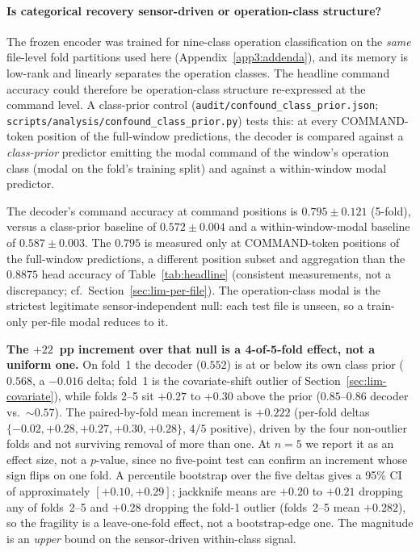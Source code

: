 \documentclass[sensors,article,submit,moreauthors,pdftex]{Definitions/mdpi}
\begin{document}
\paragraph{Is categorical recovery sensor-driven or operation-class structure?}\label{sec:disc-confound}\hspace*{0pt plus 1fill}

The frozen encoder was trained for nine-class operation classification on the \emph{same} file-level fold partitions used here (Appendix~\ref{app3:addenda}), and its memory is low-rank and linearly separates the operation classes. The headline command accuracy could therefore be operation-class structure re-expressed at the command level. A class-prior control (\texttt{audit/confound\_class\_prior.json}; \texttt{scripts/analysis/confound\_class\_prior.py}) tests this: at every COMMAND-token position of the full-window predictions, the decoder is compared against a \emph{class-prior} predictor emitting the modal command of the window's operation class (modal on the fold's training split) and against a within-window modal predictor.

The decoder's command accuracy at command positions is $0.795 \pm 0.121$ (5-fold), versus a class-prior baseline of $0.572 \pm 0.004$ and a within-window-modal baseline of $0.587 \pm 0.003$. The $0.795$ is measured only at COMMAND-token positions of the full-window predictions, a different position subset and aggregation than the $0.8875$ head accuracy of Table~\ref{tab:headline} (consistent measurements, not a discrepancy; cf.\ Section~\ref{sec:lim-per-file}). The operation-class modal is the strictest legitimate sensor-independent null: each test file is unseen, so a train-only per-file modal reduces to it.

\textbf{The $+22$~pp increment over that null is a 4-of-5-fold effect, not a uniform one.} On fold~1 the decoder ($0.552$) is at or below its own class prior ($0.568$, a $-0.016$ delta; fold~1 is the covariate-shift outlier of Section~\ref{sec:lim-covariate}), while folds 2--5 sit $+0.27$ to $+0.30$ above the prior ($0.85$--$0.86$ decoder vs.\ $\sim\!0.57$). The paired-by-fold mean increment is $+0.222$ (per-fold deltas $\{-0.02, +0.28, +0.27, +0.30, +0.28\}$, $4/5$ positive), driven by the four non-outlier folds and not surviving removal of more than one. At $n\!=\!5$ we report it as an effect size, not a $p$-value, since no five-point test can confirm an increment whose sign flips on one fold. A percentile bootstrap over the five deltas gives a 95\% CI of approximately $[+0.10, +0.29]$; jackknife means are $+0.20$ to $+0.21$ dropping any of folds~2--5 and $+0.28$ dropping the fold-1 outlier (folds~2--5 mean $+0.282$), so the fragility is a leave-one-fold effect, not a bootstrap-edge one. The magnitude is an \emph{upper} bound on the sensor-driven within-class signal.
\end{document}
